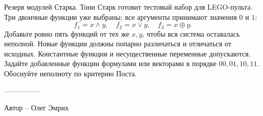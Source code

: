 \question
Резерв модулей Старка. Тони Старк готовит тестовый набор для LEGO-пульта. Три двоичные функции уже выбраны; все аргументы принимают значения $0$ и $1$:
\[
f_1=x\land y,\quad f_2=x\lor y,\quad f_3=x\oplus y.
\]
Добавьте ровно пять функций от тех же $x,y$, чтобы вся система оставалась неполной. Новые функции должны попарно различаться и отличаться от исходных. Константные функции и несущественные переменные допускаются. Задайте добавленные функции формулами или векторами в порядке $00,01,10,11$. Обоснуйте неполноту по критерию Поста.

---------------

Автор -- Олег Эмрих
